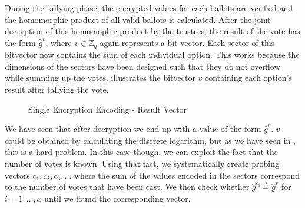 \documentclass[numbers=noenddot, abstract=on, a4paper, headsepline,
footsepline, oneside, draft=off]{scrreprt}
\begin{document}
During the tallying phase, the encrypted values for each ballots are verified
and the homomorphic product of all valid ballots is calculated. After the joint
decryption of this homomophic product by the trustees, the result of the vote
has the form $\hat{g}^v$, where $v \in \mathbb{Z}_q$ again represents a bit
vector. Each sector of this bitvector now contains the sum of each individual
option. This works because the dimensions of the sectors have been designed such
that they do not overflow while summing up the votes.
 illustrates the bitvector $v$
containing each option's result after tallying the vote.

 \begin{figure}[htbp]
	\centering
	\caption{Single Encryption Encoding - Result Vector}
	\label{fig:singleencryptionencodingresult}
\end{figure}

We have seen that after decryption we end up with a value of the form
$\hat{g}^v$. $v$ could be obtained by calculating the discrete logarithm, but as
we have seen in , this is a hard problem. In this
case though, we can exploit the fact that the number of votes is known. Using
that fact, we systematically create probing vectors $c_1, c_2, c_3, \ldots$ where
the sum of the values encoded in the sectors correspond to the number of votes
that have been cast. We then check whether
$\hat{g}^{c_i}\stackrel{?}{=}\hat{g}^v$ for $i=1, \ldots, x$ until we found the
corresponding vector. 
\end{document}
